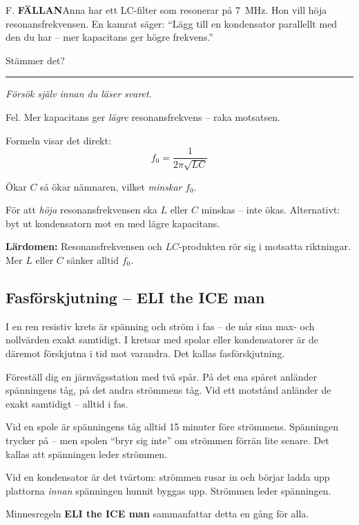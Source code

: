 \documentclass[a4paper,11pt,twoside]{book}
\newcommand{\emoji}[1]{{\emojifont #1}}
\newcommand{\qfallan}{\colorbox{ljusbrun}{\textcolor{kakao}{\headingfont\bfseries\tiny FÄLLAN}}}
\begin{document}
\begin{qblock}{F.}
\qfallan\quad Anna har ett LC-filter som resonerar
på 7~MHz. Hon vill höja resonansfrekvensen.
En kamrat säger: ``Lägg till en kondensator parallellt
med den du har -- mer kapacitans ger högre frekvens.''

Stämmer det?
\end{qblock}

\medskip
\noindent\rule{\textwidth}{0.4pt}
{\small\itshape Försök själv innan du läser svaret.}
\medskip

\begin{worked}[title={Lösning -- Fallgropsfråga 1.7.4\,F}]
Fel. Mer kapacitans ger \emph{lägre} resonansfrekvens
-- raka motsatsen.

Formeln visar det direkt:
\[ f_0 = \frac{1}{2\pi\sqrt{LC}} \]

Ökar $C$ så ökar nämnaren, vilket \emph{minskar} $f_0$.

För att \emph{höja} resonansfrekvensen ska $L$ eller
$C$ minskas -- inte ökas. Alternativt: byt ut
kondensatorn mot en med lägre kapacitans.

\textbf{Lärdomen:} Resonansfrekvensen och $LC$-produkten
rör sig i motsatta riktningar. Mer $L$ eller $C$
sänker alltid $f_0$.
\end{worked}

\subsection{Fasförskjutning -- ELI the ICE man}

I en ren resistiv krets är spänning och ström i fas --
de når sina max- och nollvärden exakt samtidigt.
I kretsar med spolar eller kondensatorer är de
däremot förskjutna i tid mot varandra.
Det kallas fasförskjutning.

\begin{storybox}[{\emoji{💡} Tågen som aldrig kommer samtidigt}]
Föreställ dig en järnvägsstation med två spår.
På det ena spåret anländer spänningens tåg,
på det andra strömmens tåg. Vid ett motstånd
anländer de exakt samtidigt -- alltid i fas.

Vid en spole är spänningens tåg alltid 15 minuter
före strömmens. Spänningen trycker på -- men spolen
``bryr sig inte'' om strömmen förrän lite senare.
Det kallas att spänningen leder strömmen.

Vid en kondensator är det tvärtom: strömmen rusar
in och börjar ladda upp plattorna \emph{innan}
spänningen hunnit byggas upp. Strömmen leder spänningen.

Minnesregeln \textbf{ELI the ICE man} sammanfattar
detta en gång för alla.
\end{storybox}
\end{document}
